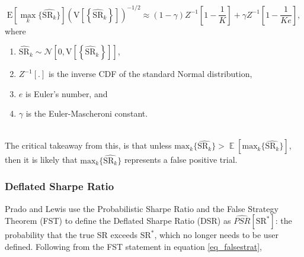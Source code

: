 \documentclass[a4paper,11pt,oneside]{article}
\DeclareMathOperator*{\E}{\mathbb{E}}
\theoremstyle{plain}
\theoremstyle{definition}
\begin{document}
	\begin{equation}\label{eq_falsestrat}
		\mathrm{E}\left[{\max_k}\{\widehat{\mathrm{SR}_k}\}\right]\left(\mathrm{V}\left[\left\{\widehat{\mathrm{SR}}_{k}\right\}\right]\right)^{-1 / 2}\approx(1-\gamma) Z^{-1}\left[1-\frac{1}{K}\right]+\gamma Z^{-1}\left[1-\frac{1}{K e}\right], 
	\end{equation}
		where
	\begin{enumerate}
		\item $\widehat{\mathrm{SR}}_{k} \sim \mathcal{N}\left[0, \mathrm{V}\left[\left\{\widehat{\mathrm{SR}}_{k}\right\}\right]\right]$, 
		\item $Z^{-1}[.]$ is the inverse CDF of the standard Normal distribution, 
		\item $e$ is Euler's number, and 
		\item $\gamma$ is the Euler-Mascheroni constant.
	\end{enumerate}
	~\\
	The critical takeaway from this, is that unless $\mathrm{max}_k\{\widehat{\mathrm{SR}_k}\} > \E\left[\mathrm{max}_k\{\widehat{\mathrm{SR}_k}\}\right]$, then it is likely that $\mathrm{max}_k\{\widehat{\mathrm{SR}_k}\}$ represents a false positive trial.\newline

	\subsubsection{Deflated Sharpe Ratio}\label{imp_dsr_detail}	

	Prado and Lewis use the Probabilistic Sharpe Ratio and the False Strategy Theorem (FST) to define the Deflated Sharpe Ratio (DSR) as $\widehat{PSR}[\mathrm{SR}^*]$: the probability that the true SR exceeds $\mathrm{SR}^*$, which no longer needs to be user defined. Following from the FST statement in equation \eqref{eq_falsestrat}, 
\end{document}
